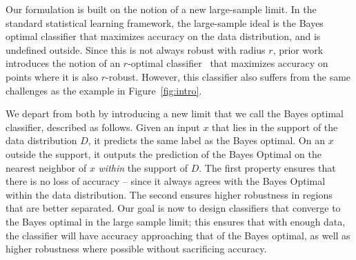 %	
%	

Our formulation is built on the notion of a new large-sample limit. In the standard statistical learning framework, the large-sample ideal is the Bayes optimal classifier that maximizes accuracy on the data distribution, and is undefined outside. Since this is not always robust with radius $r$, prior work introduces the notion of an $r$-optimal classifier~\cite{YRWC19} that maximizes accuracy on points where it is also $r$-robust. However, this classifier also suffers from the same challenges as the example in Figure~\ref{fig:intro}. 

We depart from both by introducing a new limit that we call the \natural\emph{ }Bayes optimal classifier, described as follows. Given an input $x$ that lies in the support of the data distribution $D$, it predicts the same label as the Bayes optimal. On an $x$ outside the support, it outputs the prediction of the Bayes Optimal on the nearest neighbor of $x$ {\em{within}} the support of $D$. The first property ensures that there is no loss of accuracy -- since it always agrees with the Bayes Optimal within the data distribution. The second ensures higher robustness in regions that are better separated. Our goal is now to design classifiers that converge to the \natural\emph{ }Bayes optimal in the large sample limit; this ensures that with enough data, the classifier will have accuracy approaching that of the Bayes optimal, as well as higher robustness where possible without sacrificing accuracy. 

